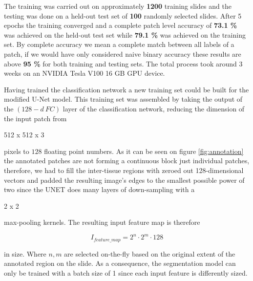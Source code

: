 \documentclass[a4paper,12pt]{article}
\begin{document}
\vspace{4mm}

\par The training was carried out on approximately \textbf{1200} training slides and the testing was done on a held-out test set of \textbf{100} randomly selected slides. After 5 epochs the training converged and a complete patch level accuracy of \textbf{73.1 \%} was achieved on the held-out test set while \textbf{79.1 \%} was achieved on the training set. By complete accuracy we mean a complete match between all labels of a patch, if we would have only considered naive binary accuracy these results are above \textbf{95 \%} for both training and testing sets. The total process took around 3 weeks on an NVIDIA Tesla V100 16 GB GPU device.

\vspace{4mm}

\par Having trained the classification network a new training set could be built for the modified U-Net model. This training set was assembled by taking the output of the $(128-d \ FC)$ layer of the classification network, reducing the dimension of the input patch from \begin{markdown}
512 x 512 x 3
\end{markdown}
pixels to $128$ floating point numbers. As it can be seen on figure \ref{fig:annotation} the annotated patches are not forming a continuous block just individual patches, therefore, we had to fill the inter-tissue regions with zeroed out 128-dimensional vectors and padded the resulting image's edges to the smallest possible power of two since the UNET does many layers of down-sampling with a \begin{markdown}
2 x 2
\end{markdown}
max-pooling kernels. The resulting input feature map is therefore 

\begin{equation*}
    I_{feature\_map} = 2^{n} \cdot 2^{m} \cdot 128
\end{equation*}

\par in size. Where $n, m$ are selected on-the-fly based on the original extent of the annotated region on the slide. As a consequence, the segmentation model can only be trained with a batch size of 1 since each input feature is differently sized. 

\vspace{4mm}
\end{document}
